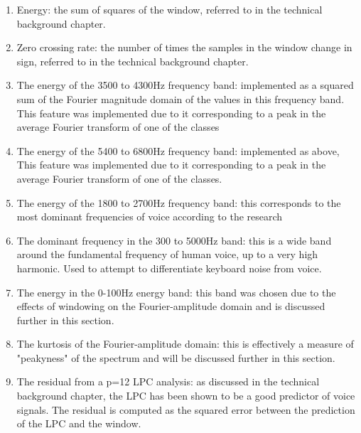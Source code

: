 \documentclass[ %
                    author={Sam Phippen},
                supervisor={Dr. Rafal Bogacz},
                     title={Real time voice activity detectors in noisy personal computing environments},
                  subtitle={},
                    degree={MEng},
                      year={2012} ]{thesis}
\begin{document}
\begin{enumerate}
    \item Energy: the sum of squares of the window, referred to in the technical
        background chapter.

    \item Zero crossing rate: the number of times the samples in the window
        change in sign, referred to in the technical background chapter.

    \item The energy of the 3500 to 4300Hz frequency band: implemented as a
        squared sum of the Fourier magnitude domain of the values in this
        frequency band. This feature was implemented due to it corresponding to
        a peak in the average Fourier transform of one of the classes

    \item The energy of the 5400 to 6800Hz frequency band: implemented as
        above, This feature was implemented due to it corresponding to a peak
        in the average Fourier transform of one of the classes.

    \item The energy of the 1800 to 2700Hz frequency band: this corresponds to
        the most dominant frequencies of voice according to the research

    \item The dominant frequency in the 300 to 5000Hz band: this is a wide band
        around the fundamental frequency of human voice, up to a very high
        harmonic. Used to attempt to differentiate keyboard noise from voice.

    \item The energy in the 0-100Hz energy band: this band was chosen due to
        the effects of windowing on the Fourier-amplitude domain and is
        discussed further in this section.

    \item The kurtosis of the Fourier-amplitude domain: this is effectively a
        measure of "peakyness" of the spectrum and will be discussed further
        in this section.

    \item The residual from a p=12 LPC analysis: as discussed in the technical
        background chapter, the LPC has been shown to be a good predictor of
        voice signals. The residual is computed as the squared error between
        the prediction of the LPC and the window.


\end{enumerate}
\end{document}
